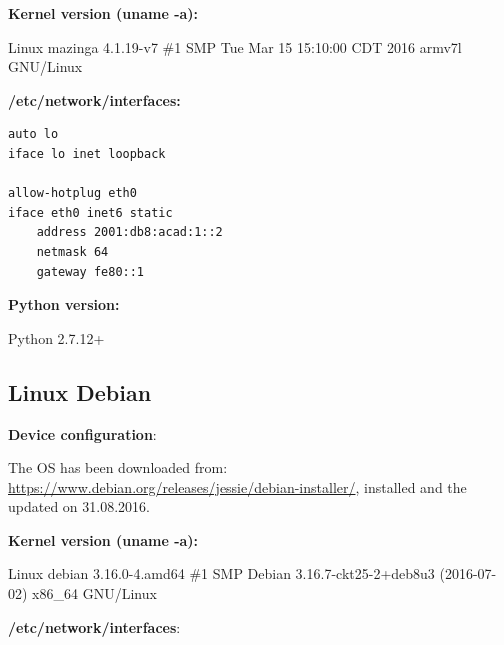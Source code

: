 \documentclass[12pt]{article}
\begin{document}
\textbf{Kernel version (uname -a):}

\vspace{-15pt}
Linux mazinga 4.1.19-v7 \#1 SMP Tue Mar 15 15:10:00 CDT 2016 armv7l GNU/Linux


\textbf{/etc/network/interfaces:}

\vspace{-5pt}
\begin{lstlisting}[style=python,basicstyle=\ttfamily\scriptsize]
auto lo
iface lo inet loopback

allow-hotplug eth0
iface eth0 inet6 static
	address 2001:db8:acad:1::2
	netmask 64
	gateway fe80::1
\end{lstlisting}

\textbf{Python version:} 

\vspace{-15pt}
Python 2.7.12+

\subsection{Linux Debian}

\textbf{Device configuration}:

\begin{savenotes}
\begin{table}[!htpb]
\centering
\addtolength{\tabcolsep}{1pt}
\noindent{}
\caption{Linux Debian}
\label{table:linuxDeb}
\end{table}
\end{savenotes}

The OS has been downloaded from: \url{https://www.debian.org/releases/jessie/debian-installer/}, installed and the updated on 31.08.2016.

\textbf{Kernel version (uname -a):} 

\vspace{-15pt}
Linux debian 3.16.0-4.amd64 \#1 SMP Debian 3.16.7-ckt25-2+deb8u3 (2016-07-02) x86_64 GNU/Linux

\textbf{/etc/network/interfaces}:
\end{document}
